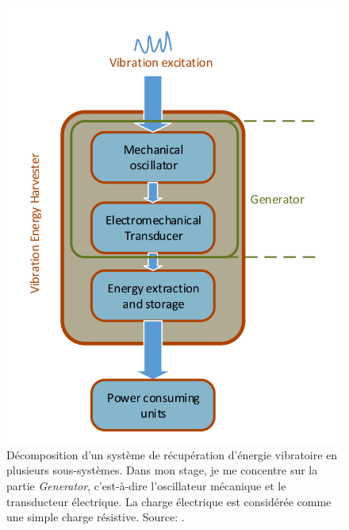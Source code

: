 \documentclass[a4paper, french, 12pt, titlepage]{article}
\begin{document}
\begin{figure}
  \begin{center}
    \includegraphics[width = .35\textwidth]{images/weiqun_lui_harvester}
  \end{center}
  \caption{Décomposition d'un système de récupération d'énergie vibratoire en plusieurs sous-systèmes.
    Dans mon stage, je me concentre sur la partie \textit{Generator}, c'est-à-dire l'oscillateur mécanique et le transducteur électrique.
    La charge électrique est considérée comme une simple charge résistive. Source:  \cite{Liu2014}.}
  \label{fig:wl_subsystems}
\end{figure}
\end{document}
